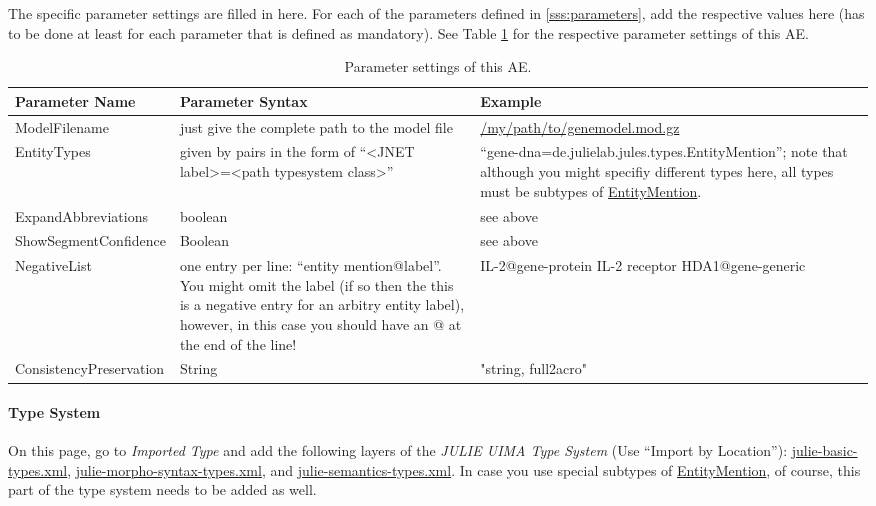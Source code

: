 \documentclass[11pt,a4paper,halfparskip]{scrartcl}
\begin{document}
The specific parameter settings are filled in here. For each of the
parameters defined in \ref{sss:parameters}, add the respective values
here (has to be done at least for each parameter that is defined as
mandatory). See Table \ref{tab:param_settings} for the respective
parameter settings of this AE.

\begin{table}[h!]
  \centering
  \begin{tabular}{|p{4cm}|p{4cm}|p{8cm}|}
    \hline
    Parameter Name & Parameter Syntax & Example \\
    \hline\hline
    ModelFilename & just give the complete path to the model file
    & \url{/my/path/to/genemodel.mod.gz} \\
    \hline
    EntityTypes & given by pairs in the form of ``<JNET label>=<path typesystem
    class>'' &
    ``gene-dna=de.julielab.jules.types.EntityMention''; note that although you might specifiy different types here, all types must be subtypes of \url{EntityMention}.\\
    \hline
    ExpandAbbreviations & boolean & see above\\
    \hline
    ShowSegmentConfidence & Boolean & see above\\
    \hline
    NegativeList & one entry per line: ``entity mention@label''. You might omit the label (if so then the this is a negative entry for an arbitry entity label), however, in this case you should have an @ at the end of the line!
    & IL-2@gene-protein\newline
    IL-2 receptor\newline
    HDA1@gene-generic\newline
    \\
    \hline
    ConsistencyPreservation & String & "string, full2acro"\\
    \hline
  \end{tabular}
  \caption{Parameter settings of this AE.}
  \label{tab:param_settings}
\end{table}

\paragraph{Type System}
\label{sss:type_system}
On this page, go to \emph{Imported Type} and add the following layers
of the \emph{JULIE UIMA Type System} (Use ``Import by Location''):
\url{julie-basic-types.xml}, \url{julie-morpho-syntax-types.xml}, and
\url{julie-semantics-types.xml}. In case you use special subtypes of
\url{EntityMention}, of course, this part of the type system needs to
be added as well.
\end{document}
